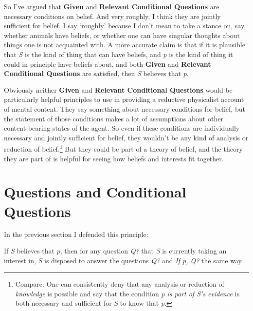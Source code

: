 \documentclass[11pt,]{book}
\providecommand{\tightlist}{%
  \setlength{\itemsep}{0pt}\setlength{\parskip}{0pt}}
\let\rmarkdownfootnote\footnote%
\def\footnote{\protect\rmarkdownfootnote}
\begin{document}
So I've argued that \textbf{Given} and \textbf{Relevant Conditional Questions} are necessary conditions on belief. And very roughly, I think they are jointly sufficient for belief. I say `roughly' because I don't mean to take a stance on, say, whether animals have beliefs, or whether one can have singular thoughts about things one is not acquainted with. A more accurate claim is that if it is plausible that \emph{S} is the kind of thing that can have beliefs, and \emph{p} is the kind of thing it could in principle have beliefs about, and both \textbf{Given} and \textbf{Relevant Conditional Questions} are satisfied, then \emph{S} believes that \emph{p}.

Obviously neither \textbf{Given} and \textbf{Relevant Conditional Questions} would be particularly helpful principles to use in providing a reductive physicalist account of mental content. They say something about necessary conditions for belief, but the statement of those conditions makes a lot of assumptions about other content-bearing states of the agent. So even if these conditions are individually necessary and jointly sufficient for belief, they wouldn't be any kind of analysis or reduction of belief.\footnote{Compare: One can consistently deny that any analysis or reduction of \emph{knowledge} is possible and say that the condition \emph{p is part of S's evidence} is both necessary and sufficient for \emph{S} to know that \emph{p}.} But they could be part of a theory of belief, and the theory they are part of is helpful for seeing how beliefs and interests fit together.

\hypertarget{questions}{%
\section{Questions and Conditional Questions}\label{questions}}

In the previous section I defended this principle:

\begin{description}
\tightlist
\item[Relevant Conditional Questions]
If \emph{S} believes that \(p\), then for any question \emph{Q?} that \emph{S} is currently taking an interest in, \emph{S} is disposed to answer the questions \emph{Q?} and \emph{If p, Q?} the same way.
\end{description}
\end{document}
